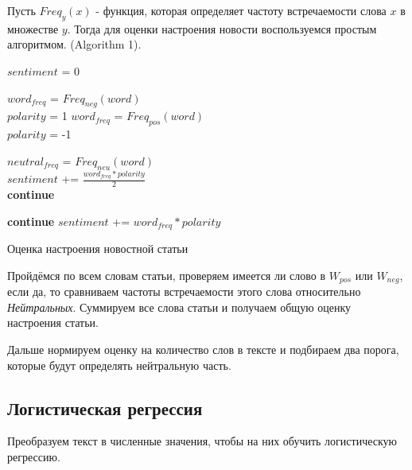 \documentclass[12pt]{article}
\begin{document}
            Пусть $Freq_y(x)$ - функция, которая определяет частоту встречаемости слова $x$
            в множестве $y$. Тогда для оценки настроения новости воспользуемся простым алгоритмом.
            (Algorithm 1). 
            
            \begin{algorithm}[H]
                $sentiment$ = 0

                 {
                     {
                        $word_{freq}$ = $Freq_{neg}(word)$\\
                        $polarity$ = 1
                    }
                     {
                        $word_{freq}$ = $Freq_{pos}(word)$\\
                        $polarity$ = -1
                    }

                     {
                        $neutral_{freq}$ = $Freq_{neu}(word)$\\
                        
                         {
                            $sentiment$ += $\frac{word_{freq}* polarity}{2}$\\
                            \textbf{continue}
                        }

                         {
                            \textbf{continue}
                        }
                        $sentiment$ += $word_{freq}* polarity$
                    }
                }
                \caption{Оценка настроения новостной статьи}
            \end{algorithm}

            Пройдёмся по всем словам статьи, проверяем имеется ли слово в $W_{pos}$ или $W_{neg}$,
            если да, то сравниваем частоты встречаемости этого слова относительно \textit{Нейтральных}.
            Суммируем все слова статьи и получаем общую оценку настроения статьи.

            Дальше нормируем оценку на количество слов в тексте и подбираем два порога, которые будут
            определять нейтральную часть. 
            
        \subsection{Логистическая регрессия}
            Преобразуем текст в численные значения, чтобы на них обучить логистическую регрессию.
\end{document}

